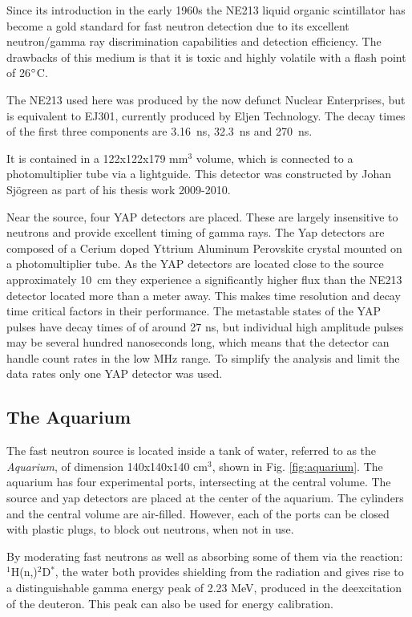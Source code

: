\documentclass[main.tex]{subfiles}
\begin{document}
Since its introduction in the early 1960s the NE213 liquid organic scintillator has become a gold standard for fast neutron detection due to its excellent neutron/gamma ray discrimination capabilities and detection efficiency. The drawbacks of this medium is that it is toxic and highly volatile with a flash point of 26$\text{\degree}$C. 

The NE213 used here was produced by the now defunct Nuclear Enterprises, but is equivalent to EJ301, currently produced by Eljen Technology. The decay times of the first three components are \SI{3.16}{ns}, \SI{32.3}{ns} and \SI{270}{ns}\cite{Eljen}.

It is contained in a 122x122x179 \si{\mm}$^\text{3}$ volume, which is connected to a photomultiplier tube via a lightguide. This detector was constructed by Johan Sjögreen as part of his thesis work 2009-2010\cite{sjogren}.

Near the source, four YAP detectors are placed. These are largely insensitive to neutrons and provide excellent timing of gamma rays. The Yap detectors are composed of a Cerium doped Yttrium Aluminum Perovskite crystal mounted on a photomultiplier tube. As the YAP detectors are located close to the source approximately \si{10\cm} they experience a significantly higher flux than the NE213 detector located more than a meter away. This makes time resolution and decay time critical factors in their performance. The metastable states of the YAP pulses have decay times of of around 27 ns, but individual high amplitude pulses may be several hundred nanoseconds long, which means that the detector can handle count rates in the low MHz range. To simplify the analysis and limit the data rates only one YAP detector was used.

\subsection{The Aquarium}
The fast neutron source is located inside a tank of water, referred to as the \textit{Aquarium}, of dimension 140x140x140 \si{\cm}${}^\text{3}$, shown in Fig. \ref{fig:aquarium}. The aquarium has four experimental ports, intersecting at the central volume. The source and yap detectors are placed at the center of the aquarium. The cylinders and the central volume are air-filled. However, each of the ports can be closed with plastic plugs, to block out neutrons, when not in use.

By moderating fast neutrons as well as absorbing some of them via the reaction: $^{\text{1}}$H(n,\textgamma)$^{\text{2}}$D$^*$, the water both provides shielding from the radiation and gives rise to a distinguishable gamma energy peak of 2.23 MeV, produced in the deexcitation of the deuteron. This peak can also be used for energy calibration.
\end{document}
